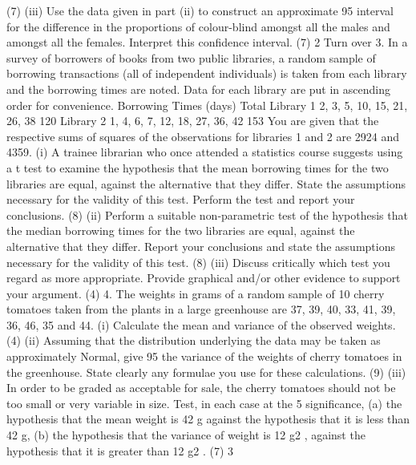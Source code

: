 (7)
(iii) Use the data given in part (ii) to construct an approximate 95%
interval for the difference in the proportions of colour-blind amongst all the
males and amongst all the females. Interpret this confidence interval.
(7)
2
Turn over 
3. In a survey of borrowers of books from two public libraries, a random sample of
borrowing transactions (all of independent individuals) is taken from each library and
the borrowing times are noted. Data for each library are put in ascending order for
convenience.
Borrowing Times (days) Total
Library 1 2, 3, 5, 10, 15, 21, 26, 38 120
Library 2 1, 4, 6, 7, 12, 18, 27, 36, 42 153
You are given that the respective sums of squares of the observations for libraries 1
and 2 are 2924 and 4359.
(i) A trainee librarian who once attended a statistics course suggests using a t test
to examine the hypothesis that the mean borrowing times for the two libraries
are equal, against the alternative that they differ. State the assumptions
necessary for the validity of this test. Perform the test and report your
conclusions.
(8)
(ii) Perform a suitable non-parametric test of the hypothesis that the median
borrowing times for the two libraries are equal, against the alternative that they
differ. Report your conclusions and state the assumptions necessary for the
validity of this test.
(8)
(iii) Discuss critically which test you regard as more appropriate. Provide
graphical and/or other evidence to support your argument.
(4)
4. The weights in grams of a random sample of 10 cherry tomatoes taken from the plants
in a large greenhouse are 37, 39, 40, 33, 41, 39, 36, 46, 35 and 44.
(i) Calculate the mean and variance of the observed weights.
(4)
(ii) Assuming that the distribution underlying the data may be taken as
approximately Normal, give 95%
the variance of the weights of cherry tomatoes in the greenhouse. State clearly
any formulae you use for these calculations.
(9)
(iii) In order to be graded as acceptable for sale, the cherry tomatoes should not be
too small or very variable in size. Test, in each case at the 5%
significance, (a) the hypothesis that the mean weight is 42 g against the
hypothesis that it is less than 42 g, (b) the hypothesis that the variance of
weight is 12 g2
, against the hypothesis that it is greater than 12 g2
.
(7)
3 
